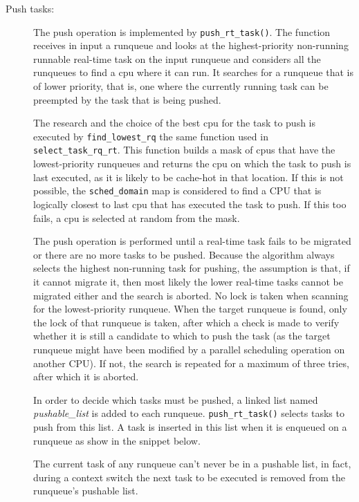 \begin{description}
\item[Push tasks:] The push operation is implemented by \texttt{push\_rt\_task()}. The function receives in input a runqueue and looks at the 
highest-priority non-running runnable real-time task on the input runqueue and considers all the runqueues to find a cpu where it can run. It searches for 
a runqueue that is of lower priority, that is, one where the currently running task can be preempted by the task that is being pushed. 

The research and the choice of the best cpu for the task to push is executed by \texttt{find\_lowest\_rq} the same function used in 
\texttt{select\_task\_rq\_rt}. This function builds a mask of cpus that have the lowest-priority runqueues and returns the cpu on which the task to push is 
last executed, as it is likely to be cache-hot in that location. If this is not possible, the \texttt{sched\_domain} map is considered to find a CPU that 
is logically closest to last cpu that has executed the task to push. If this too fails, a cpu is selected at random from the mask.

The push operation is performed until a real-time task fails to be migrated or there are no more tasks to be pushed. Because the algorithm always selects 
the highest non-running task for pushing, the assumption is that, if it cannot migrate it, then most likely the lower real-time tasks cannot be migrated 
either and the search is aborted. No lock is taken when scanning for the lowest-priority runqueue. When the target runqueue is found, only the lock of that 
runqueue is taken, after which a check is made to verify whether it is still a candidate to which to push the task (as the target runqueue might have been 
modified by a parallel scheduling operation on another CPU). If not, the search is repeated for a maximum of three tries, after which it is aborted. 

In order to decide which tasks must be pushed, a linked list named \textit{pushable\_list} is added to each runqueue. \texttt{push\_rt\_task()} selects tasks
to push from this list. A task is inserted in this list when it is enqueued on a runqueue as show in the snippet below.

\lstset{basicstyle=\footnotesize, language=c, captionpos=b, frame=single, label=lis:steps}


The current task of any runqueue can't never be in a pushable list, in fact, during a context switch the next task to be executed is removed from the 
runqueue's pushable list.


\end{description}
